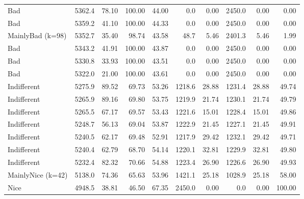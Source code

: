\documentclass[journal,10pt,twoside]{IEEEtran}
\begin{document}
\begin{table}[ht]
\begin{tabular}{l|rrrr|rrrrr}
		Bad               & 5362.4 &  78.10 & 100.00 &   44.00 &    0.0 &                   0.00 & 2450.0 &                    0.00 &     0.00 \\
		Bad               & 5359.2 &  41.10 & 100.00 &   44.33 &    0.0 &                   0.00 & 2450.0 &                    0.00 &     0.00 \\
		MainlyBad (k=98)  & 5352.7 &  35.40 &  98.74 &   43.58 &   48.7 &                   5.46 & 2401.3 &                    5.46 &     1.99 \\
		Bad               & 5343.2 &  41.91 & 100.00 &   43.87 &    0.0 &                   0.00 & 2450.0 &                    0.00 &     0.00 \\
		Bad               & 5330.8 &  33.93 & 100.00 &   43.51 &    0.0 &                   0.00 & 2450.0 &                    0.00 &     0.00 \\
		Bad               & 5322.0 &  21.00 & 100.00 &   43.61 &    0.0 &                   0.00 & 2450.0 &                    0.00 &     0.00 \\
		Indifferent       & 5275.9 &  89.52 &  69.73 &   53.26 & 1218.6 &                  28.88 & 1231.4 &                   28.88 &    49.74 \\
		Indifferent       & 5265.9 &  89.16 &  69.80 &   53.75 & 1219.9 &                  21.74 & 1230.1 &                   21.74 &    49.79 \\
		Indifferent       & 5265.5 &  67.17 &  69.57 &   53.43 & 1221.6 &                  15.01 & 1228.4 &                   15.01 &    49.86 \\
		Indifferent       & 5248.7 &  56.13 &  69.04 &   53.87 & 1222.9 &                  21.45 & 1227.1 &                   21.45 &    49.91 \\
		Indifferent       & 5240.5 &  62.17 &  69.48 &   52.91 & 1217.9 &                  29.42 & 1232.1 &                   29.42 &    49.71 \\
		Indifferent       & 5240.4 &  62.79 &  68.70 &   54.14 & 1220.1 &                  32.81 & 1229.9 &                   32.81 &    49.80 \\
		Indifferent       & 5232.4 &  82.32 &  70.66 &   54.88 & 1223.4 &                  26.90 & 1226.6 &                   26.90 &    49.93 \\
		MainlyNice (k=42) & 5138.0 &  74.36 &  65.63 &   53.96 & 1421.1 &                  25.18 & 1028.9 &                   25.18 &    58.00 \\
		Nice              & 4948.5 &  38.81 &  46.50 &   67.35 & 2450.0 &                   0.00 &    0.0 &                    0.00 &   100.00 \\

\end{tabular}
\end{table}
\end{document}
